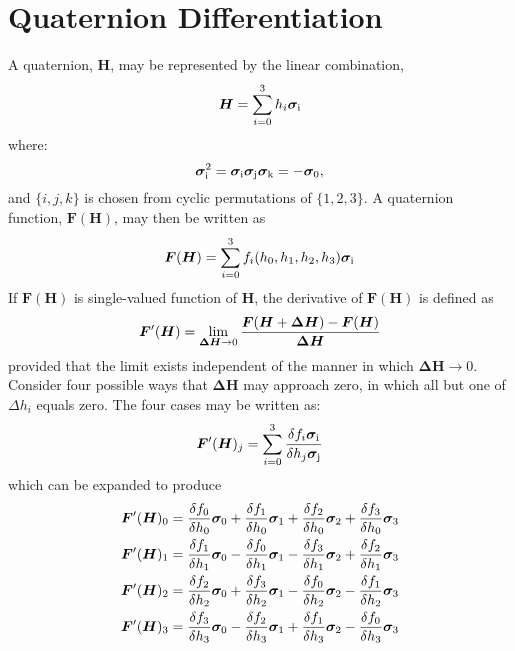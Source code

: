 \documentclass[12pt]{article}
\newcommand{\pauli}[1]{\ensuremath{ {\bm\sigma}_{\rm #1} }}
\begin{document}
\section{Quaternion Differentiation}

A quaternion, $\bm{H}$, may be represented by the linear combination,
\begin{equation}
\bm{H}=\sum_{i=0}^3 h_i\pauli{i}
\end{equation}
where:
\begin{equation}\label{eqn:properties}
\pauli{i}^2 = \pauli{i}\pauli{j}\pauli{k} = -\pauli{0},
\end{equation}
and $\{i,j,k\}$ is chosen from cyclic permutations of $\{1,2,3\}$.
A quaternion function, $\bm{F}(\bm{H})$, may then be written as
\begin{equation}
\bm{F}(\bm{H})=\sum_{i=0}^3 f_i(h_0,h_1,h_2,h_3)\pauli{i}
\end{equation}
If $\bm{F}(\bm{H})$ is single-valued function of $\bm{H}$, the derivative
of $\bm{F}(\bm{H})$ is defined as
\begin{equation}
\bm{F}^\prime(\bm{H}) = \lim_{\bm{\Delta H}\to0}
	{ {\bm{F}(\bm{H}+\bm{\Delta H}) - \bm{F}(\bm{H})}\over{\bm{\Delta H}} }
\end{equation}
provided that the limit exists independent of the manner in which
$\bm{\Delta H}\to0$.  Consider four possible ways that $\bm{\Delta H}$ may
approach zero, in which all but one of $\Delta h_i$ equals zero.  The
four cases may be written as:
\begin{equation}
\bm{F}^\prime(\bm{H})_j = \sum_{i=0}^3 
{ {\delta{f_i}\pauli{i}}\over{\delta{h_j}\pauli{j}} } 
\end{equation}
which can be expanded to produce
\begin{eqnarray}
\bm{F}^\prime(\bm{H})_0 =
  { {\delta{f_0}}\over{\delta{h_0}} }\pauli{0}
+ { {\delta{f_1}}\over{\delta{h_0}} }\pauli{1}
+ { {\delta{f_2}}\over{\delta{h_0}} }\pauli{2}
+ { {\delta{f_3}}\over{\delta{h_0}} }\pauli{3} \\
\bm{F}^\prime(\bm{H})_1 =
  { {\delta{f_1}}\over{\delta{h_1}} }\pauli{0}
- { {\delta{f_0}}\over{\delta{h_1}} }\pauli{1}
- { {\delta{f_3}}\over{\delta{h_1}} }\pauli{2}
+ { {\delta{f_2}}\over{\delta{h_1}} }\pauli{3} \\
\bm{F}^\prime(\bm{H})_2 =
  { {\delta{f_2}}\over{\delta{h_2}} }\pauli{0}
+ { {\delta{f_3}}\over{\delta{h_2}} }\pauli{1}
- { {\delta{f_0}}\over{\delta{h_2}} }\pauli{2}
- { {\delta{f_1}}\over{\delta{h_2}} }\pauli{3} \\
\bm{F}^\prime(\bm{H})_3 =
  { {\delta{f_3}}\over{\delta{h_3}} }\pauli{0}
- { {\delta{f_2}}\over{\delta{h_3}} }\pauli{1}
+ { {\delta{f_1}}\over{\delta{h_3}} }\pauli{2}
- { {\delta{f_0}}\over{\delta{h_3}} }\pauli{3}
\end{eqnarray}
\end{document}
